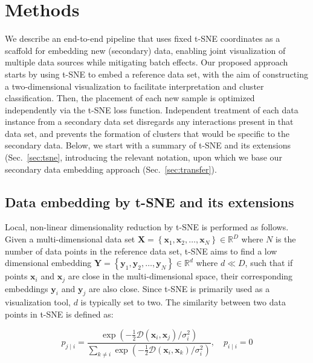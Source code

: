 \documentclass[runningheads]{llncs}
\begin{document}
\section{Methods}

We describe an end-to-end pipeline that uses fixed t-SNE coordinates as a
scaffold for embedding new (secondary) data, enabling joint visualization of
multiple data sources while mitigating batch effects. Our proposed approach
starts by using t\nobreakdash -SNE to embed a reference data set, with the aim
of constructing a two-dimensional visualization to facilitate interpretation
and cluster classification. Then, the placement of each new sample is optimized
independently via the t\nobreakdash -SNE loss function. Independent treatment
of each data instance from a secondary data set disregards any interactions
present in that data set, and prevents the formation of clusters that would be
specific to the secondary data. Below, we start with a summary of t-SNE and its
extensions (Sec.~\ref{sec:tsne}, introducing the relevant notation, upon which
we base our secondary data embedding approach (Sec.~\ref{sec:transfer}).


\subsection{Data embedding by t-SNE and its extensions\label{sec:tsne}}

Local, non-linear dimensionality reduction by t-SNE is performed as follows.
Given a multi-dimensional data set $\mathbf{X} = \left \{ \mathbf{x}_1,
\mathbf{x}_2, \dots, \mathbf{x}_N \right \} \in \mathbb{R}^D$ where $N$ is the
number of data points in the reference data set, t-SNE aims to find a low
dimensional embedding $\mathbf{Y} = \left \{ \mathbf{y}_1, \mathbf{y}_2, \dots,
\mathbf{y}_N \right \} \in \mathbb{R}^d$ where $d \ll D$, such that if points
$\mathbf{x}_i$ and $\mathbf{x}_j$ are close in the multi-dimensional space,
their corresponding embeddings $\mathbf{y}_i$ and $\mathbf{y}_j$ are also
close. Since t-SNE is primarily used as a visualization tool, $d$ is typically
set to two. The similarity between two data points in t-SNE is defined as:

\begin{equation}
p_{j \mid i} = \frac{\exp \left ( -\frac{1}{2} \mathcal{D}(\mathbf{x}_i, \mathbf{x}_j ) / \sigma_i^2 \right )}
{\sum_{k \neq i } \exp \left ( -\frac{1}{2} \mathcal{D}(\mathbf{x}_i, \mathbf{x}_k ) / \sigma_i^2 \right )}, \quad p_{i \mid i} = 0
\label{eq:gaussian_kernel}
\end{equation}
\end{document}
